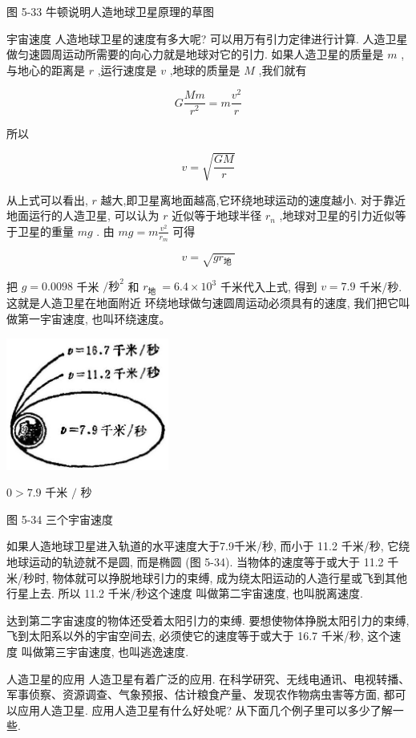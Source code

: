 \documentclass[10pt]{article}
\begin{document}
图 5-33 牛顿说明人造地球卫星原理的草图

宇宙速度 人造地球卫星的速度有多大呢? 可以用万有引力定律进行计算. 人造卫星做匀速圆周运动所需要的向心力就是地球对它的引力. 如果人造卫星的质量是 \(m\) ,与地心的距离是 \(r\) ,运行速度是 \(v\) ,地球的质量是 \(M\) ,我们就有

\[
G\frac{Mm}{{r}^{2}} = m\frac{{v}^{2}}{r}
\]

所以

\[
v = \sqrt{\frac{GM}{r}}
\]

从上式可以看出, \(r\) 越大,即卫星离地面越高,它环绕地球运动的速度越小. 对于靠近地面运行的人造卫星, 可以认为 \(r\) 近似等于地球半径 \({r}_{n}\) ,地球对卫星的引力近似等于卫星的重量 \({mg}\) . 由 \({mg} = m\frac{{v}^{2}}{{r}_{m}}\) 可得

\[
v = \sqrt{g{r}_{\text{地 }}}
\]

把 \(g = {0.0098}\) 千米 \(/{\text{秒}}^{2}\) 和 \({r}_{\text{地 }} = {6.4} \times {10}^{3}\) 千米代入上式, 得到 \(v = {7.9}\) 千米/秒. 这就是人造卫星在地面附近 环绕地球做匀速圆周运动必须具有的速度, 我们把它叫做第一宇宙速度, 也叫环绕速度。

\begin{center}
\includegraphics[max width=0.4\textwidth]{images/01912d55-147c-70aa-b0e0-1782a122f948_161_264830.jpg}
\end{center}

\(0 > {7.9}\) 千米 \(/\) 秒

图 5-34 三个宇宙速度

如果人造地球卫星进入轨道的水平速度大于7.9千米/秒, 而小于 11.2 千米/秒, 它绕地球运动的轨迹就不是圆, 而是椭圆 (图 5-34). 当物体的速度等于或大于 11.2 千米/秒时, 物体就可以挣脱地球引力的束缚, 成为绕太阳运动的人造行星或飞到其他行星上去. 所以 11.2 千米/秒这个速度 叫做第二宇宙速度, 也叫脱离速度.

达到第二字宙速度的物体还受着太阳引力的束缚. 要想使物体挣脱太阳引力的束缚, 飞到太阳系以外的宇宙空间去, 必须使它的速度等于或大于 16.7 千米/秒, 这个速度 叫做第三宇宙速度, 也叫逃逸速度.

人造卫星的应用 人造卫星有着广泛的应用. 在科学研究、无线电通讯、电视转播、军事侦察、资源调查、气象预报、估计粮食产量、发现农作物病虫害等方面, 都可以应用人造卫星. 应用人造卫星有什么好处呢? 从下面几个例子里可以多少了解一些.
\end{document}
